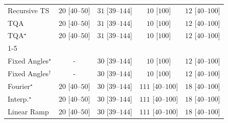\begin{tabular}{l|cccc|}
Recursive TS & {\cellcolor[HTML]{E8F6E4}} \color[HTML]{000000} $20$ [$40$--$50$] & {\cellcolor[HTML]{DCF2D7}} \color[HTML]{000000} $31$ [$39$--$144$] & {\cellcolor[HTML]{F0F9ED}} \color[HTML]{000000} $10$ [$100$] & {\cellcolor[HTML]{EFF9EB}} \color[HTML]{000000} $12$ [$40$--$100$] \\
TQA & {\cellcolor[HTML]{E8F6E4}} \color[HTML]{000000} $20$ [$40$--$50$] & {\cellcolor[HTML]{DCF2D7}} \color[HTML]{000000} $31$ [$39$--$144$] & {\cellcolor[HTML]{F0F9ED}} \color[HTML]{000000} $10$ [$100$] & {\cellcolor[HTML]{EFF9EB}} \color[HTML]{000000} $12$ [$40$--$100$] \\
TQA$^\star$ & {\cellcolor[HTML]{E8F6E4}} \color[HTML]{000000} $20$ [$40$--$50$] & {\cellcolor[HTML]{DCF2D7}} \color[HTML]{000000} $31$ [$39$--$144$] & {\cellcolor[HTML]{F0F9ED}} \color[HTML]{000000} $10$ [$100$] & {\cellcolor[HTML]{EFF9EB}} \color[HTML]{000000} $12$ [$40$--$100$] \\
\cline{1-5}
\multicolumn{5}{c}{\rule{0pt}{8pt}PP} \\
\midrule
Fixed Angles$^\star$ & {\cellcolor[HTML]{000000}} \color[HTML]{F1F1F1} {\cellcolor{white}} \color{black} - & {\cellcolor[HTML]{DDF2D8}} \color[HTML]{000000} $30$ [$39$--$144$] & {\cellcolor[HTML]{F0F9ED}} \color[HTML]{000000} $10$ [$100$] & {\cellcolor[HTML]{EFF9EB}} \color[HTML]{000000} $12$ [$40$--$100$] \\
Fixed Angles$^\dagger$ & {\cellcolor[HTML]{000000}} \color[HTML]{F1F1F1} {\cellcolor{white}} \color{black} - & {\cellcolor[HTML]{DDF2D8}} \color[HTML]{000000} $30$ [$39$--$144$] & {\cellcolor[HTML]{F0F9ED}} \color[HTML]{000000} $10$ [$100$] & {\cellcolor[HTML]{EFF9EB}} \color[HTML]{000000} $12$ [$40$--$100$] \\
Fourier$^\star$ & {\cellcolor[HTML]{E8F6E4}} \color[HTML]{000000} $20$ [$40$--$50$] & {\cellcolor[HTML]{DDF2D8}} \color[HTML]{000000} $30$ [$39$--$144$] & {\cellcolor[HTML]{4BB062}} \color[HTML]{F1F1F1} $111$ [$40$--$100$] & {\cellcolor[HTML]{EAF7E6}} \color[HTML]{000000} $18$ [$40$--$100$] \\
Interp.$^\star$ & {\cellcolor[HTML]{E8F6E4}} \color[HTML]{000000} $20$ [$40$--$50$] & {\cellcolor[HTML]{DDF2D8}} \color[HTML]{000000} $30$ [$39$--$144$] & {\cellcolor[HTML]{4BB062}} \color[HTML]{F1F1F1} $111$ [$40$--$100$] & {\cellcolor[HTML]{EAF7E6}} \color[HTML]{000000} $18$ [$40$--$100$] \\
Linear Ramp & {\cellcolor[HTML]{E8F6E4}} \color[HTML]{000000} $20$ [$40$--$50$] & {\cellcolor[HTML]{DDF2D8}} \color[HTML]{000000} $30$ [$39$--$144$] & {\cellcolor[HTML]{4BB062}} \color[HTML]{F1F1F1} $111$ [$40$--$100$] & {\cellcolor[HTML]{EAF7E6}} \color[HTML]{000000} $18$ [$40$--$100$] \\

\end{tabular}
